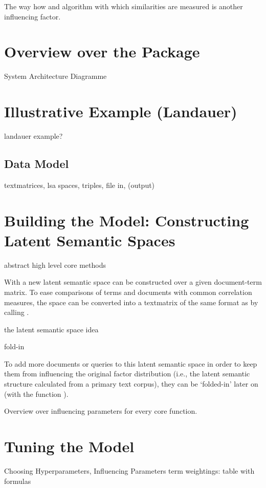 \documentclass[article]{jss}
\begin{document}
The way how and algorithm with which similarities are measured is another
influencing factor.

\section{Overview over the Package}

System Architecture Diagramme

\section{Illustrative Example (Landauer)}

landauer example?

\subsection{Data Model}

textmatrices, lsa spaces, triples, file in, (output)

\section{Building the Model: Constructing Latent Semantic Spaces}

abstract high level core methods

With  a new latent semantic space can
be constructed over a given document-term matrix. To ease
comparisons of terms and documents with common
correlation measures, the space can be converted into
a textmatrix of the same format as  
by calling .

the latent semantic space idea

fold-in

To add more documents or queries to this latent semantic
space in order to keep them from influencing the original 
factor distribution (i.e., the latent semantic structure calculated
from a primary text corpus), they can be `folded-in' later on 
(with the function ).

Overview over influencing parameters for every core function.

\section{Tuning the Model}

Choosing Hyperparameters, Influencing Parameters
term weightings: table with formulas
\end{document}
